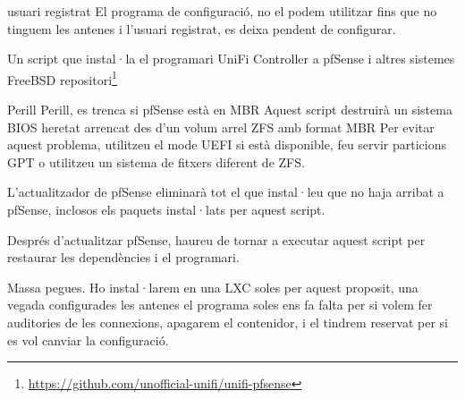 \documentclass[
  10pt,
]{krantz}
\DeclareRobustCommand{\href}[2]{#2\footnote{\url{#1}}}
\begin{document}
\begin{rmdcuidao}{usuari registrat}
El programa de configuració, no el podem utilitzar fins que no tinguem les antenes i l'usuari registrat, es deixa pendent de configurar.

\end{rmdcuidao}

Un script que instal·la el programari UniFi Controller a pfSense i altres sistemes FreeBSD \href{https://github.com/unofficial-unifi/unifi-pfsense}{repositori}

\begin{rmdwarn}{Perill}
Perill, es trenca si pfSense està en MBR Aquest script destruirà un sistema BIOS heretat arrencat des d'un volum arrel ZFS amb format MBR Per evitar aquest problema, utilitzeu el mode UEFI si està disponible, feu servir particions GPT o utilitzeu un sistema de fitxers diferent de ZFS.

\end{rmdwarn}

L'actualitzador de pfSense eliminarà tot el que instal·leu que no haja arribat a pfSense, inclosos els paquets instal·lats per aquest script.

Després d'actualitzar pfSense, haureu de tornar a executar aquest script per restaurar les dependències i el programari.

Massa pegues. Ho instal·larem en una LXC soles per aquest proposit, una vegada configurades les antenes el programa soles ens fa falta per si volem fer auditories de les connexions, apagarem el contenidor, i el tindrem reservat per si es vol canviar la configuració.

  
\end{document}
